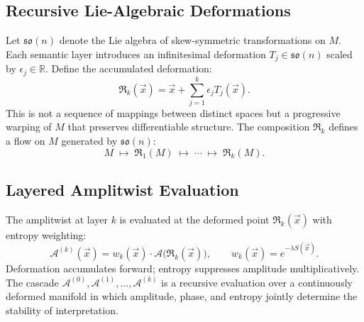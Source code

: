 \documentclass[11pt, a4paper]{article}
\begin{document}
\subsection{Recursive Lie-Algebraic Deformations}

Let $\mathfrak{so}(n)$ denote the Lie algebra of skew-symmetric
transformations on $M$. Each semantic layer introduces an infinitesimal
deformation $T_j \in \mathfrak{so}(n)$ scaled by $\epsilon_j \in
\mathbb{R}$. Define the accumulated deformation:
\[
  \mathfrak{R}_k(\vec{x}) = \vec{x} + \sum_{j=1}^k \epsilon_j T_j(\vec{x}).
\]
This is not a sequence of mappings between distinct spaces but a
progressive warping of $M$ that preserves differentiable structure. The
composition $\mathfrak{R}_k$ defines a flow on $M$ generated by
$\mathfrak{so}(n)$:
\[
  M \;\mapsto\; \mathfrak{R}_1(M) \;\mapsto\; \cdots \;\mapsto\; \mathfrak{R}_k(M).
\]

\subsection{Layered Amplitwist Evaluation}

The amplitwist at layer $k$ is evaluated at the deformed point
$\mathfrak{R}_k(\vec{x})$ with entropy weighting:
\[
  \mathcal{A}^{(k)}(\vec{x}) =
  w_k(\vec{x}) \cdot \mathcal{A}\!\bigl(\mathfrak{R}_k(\vec{x})\bigr),
  \qquad
  w_k(\vec{x}) = e^{-\lambda S(\vec{x})}.
\]
Deformation accumulates forward; entropy suppresses amplitude
multiplicatively. The cascade $\mathcal{A}^{(0)}, \mathcal{A}^{(1)},
\ldots, \mathcal{A}^{(k)}$ is a recursive evaluation over a continuously
deformed manifold in which amplitude, phase, and entropy jointly
determine the stability of interpretation.
\end{document}

